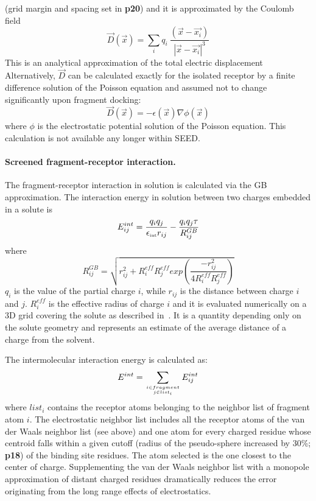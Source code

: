 \documentclass[a4paper,12pt,titlepage]{article}
\begin{document}
(grid margin and spacing set in {\bf p20}) and it is approximated
by the Coulomb field 
%
\begin{equation}
%
\vec{D}\left(\vec{x}\right) = 
\sum_{i} q_i 
\ \frac{\left(\vec{x}-\vec{x_i}\right)} 
{\left|\vec{x}-\vec{x_i}\right| ^3} 
\label{eq:Dcoul} 
%
\end{equation}
%
This is an analytical approximation of the total electric 
displacement Alternatively, $\vec{D}$ can be calculated exactly for the isolated 
receptor by a finite difference solution of the Poisson equation and 
assumed not to change significantly upon fragment docking: 
%
\begin{equation}
%
\vec{D}\left(\vec{x}\right) = 
- \epsilon\left(\vec{x}\right) \nabla \phi\left(\vec{x}\right)
\label{eq:Dfd} 
%
\end{equation}
%
where $\phi$ is the electrostatic potential solution of the Poisson 
equation. This calculation is not available any longer within SEED.


\paragraph{Screened fragment-receptor interaction.}

The fragment-receptor interaction in solution is calculated 
via the GB approximation. 
The interaction energy in solution between two charges embedded in a solute is 
%
\begin{equation}
%
E^{int}_{ij} = \frac{q_i q_j}{\epsilon_{\mbox{\tiny int}} r_{ij}} - 
\frac{q_i q_j \tau}{R^{GB}_{ij}}
\label{eq:gb}
%
\end{equation}
%
where
%
\begin{equation}
%
 R^{GB}_{ij} = \sqrt{r_{ij}^{2} + R^{eff}_{i}R^{eff}_{j}
exp\left(\frac{-r_{ij}^{2}}{4R^{eff}_{i}R^{eff}_{j}}\right)}
\label{eq:rgb}
%
\end{equation}
%
$q_i$ is the value of the partial charge $i$, while
$r_{ij}$ is the distance between charge $i$ and $j$.
$R^{eff}_{i}$ is the effective radius of charge $i$ and it is 
evaluated numerically on a 3D grid covering the solute as described 
in~\cite{Scarsi:Continuum}.  It is a quantity depending only on the 
solute geometry and represents an estimate of the average distance of 
a charge from the solvent.

The intermolecular interaction energy is calculated as:
%
\begin{equation}
%
E^{int} = \sum_{{i \in fragment} \atop{j \in list_i}} E^{int}_{ij}
\label{eq:intwat}
%
\end{equation}
%
where ${list_i}$ contains the receptor atoms belonging to the neighbor 
list of fragment atom $i$. The electrostatic neighbor list includes all the receptor 
atoms of the van der Waals neighbor list (see above) 
and one atom for every charged residue whose 
centroid falls within a given cutoff (radius of the pseudo-sphere
increased by 30\%; {\bf p18}) 
of the binding site residues. The atom selected is the one closest to the 
center of charge. Supplementing the van der Waals neighbor list with a monopole 
approximation of distant charged residues dramatically reduces the error 
originating from the long range effects of electrostatics.
\end{document}
